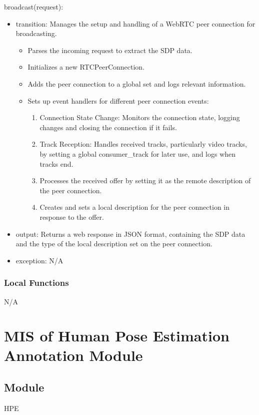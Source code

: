 \documentclass[12pt, titlepage]{article}
\begin{document}
\noindent broadcast(request):
\begin{itemize}
\item transition: Manages the setup and handling of a WebRTC peer connection for
  broadcasting.

  \begin{itemize}
  \item Parses the incoming request to extract the SDP data.
  \item Initializes a new RTCPeerConnection.
  \item Adds the peer connection to a global set and logs relevant information.
  \item Sets up event handlers for different peer connection events:
    \begin{enumerate}
    \item Connection State Change: Monitors the connection state, logging changes
      and closing the connection if it fails.
    \item Track Reception: Handles received tracks, particularly video tracks, by
      setting a global consumer\_track for later use, and logs when tracks end.
    \item Processes the received offer by setting it as the remote description of
      the peer connection.
    \item Creates and sets a local description for the peer connection in response
      to the offer.
    \end{enumerate}
  \end{itemize}
\item output: Returns a web response in JSON format, containing the SDP data and
  the type of the local description set on the peer connection.
\item exception: N/A
\end{itemize}

\subsubsection{Local Functions}
N/A

\section{MIS of Human Pose Estimation Annotation Module} \label{sec:hpe}

\subsection{Module}
HPE
\end{document}
